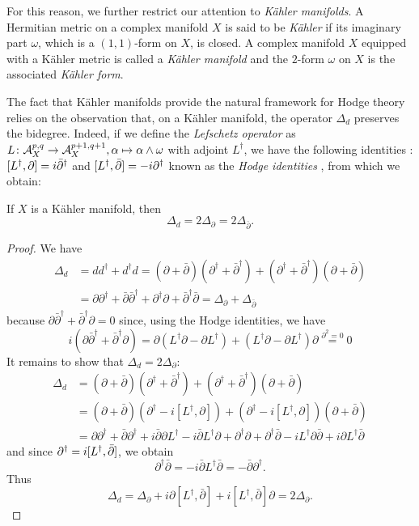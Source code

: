 \documentclass[../main.tex]{subfiles}
\begin{document}
For this reason, we further restrict our attention to \emph{K\"{a}hler manifolds}. A Hermitian metric on a complex manifold $X$ is said to be \emph{K\"{a}hler} if its imaginary part $\omega$, which is a $(1,1)$-form on $X$, is closed. A complex manifold $X$ equipped with a K\"{a}hler metric is called a \emph{K\"{a}hler manifold} and the $2$-form $\omega$ on $X$ is the associated \emph{K\"{a}hler form}. 

The fact that K\"{a}hler manifolds provide the natural framework for Hodge theory relies on the observation that, on a K\"{a}hler manifold, the operator $\Delta_d$ preserves the bidegree. Indeed, if we define the \emph{Lefschetz operator} as $L\colon \mathcal{A}^{p,q}_X \to \mathcal{A}^{p+1,q+1}_X, \alpha \mapsto \alpha\wedge\omega$ with adjoint $L^\dag$, we have the following identities \cite[Prop. 6.5]{Voi07}: $[L^\dag,\partial]=i\Bar{\partial}^\dag$ and $[L^\dag,\Bar{\partial}]=-i\partial^\dag$ known as the \emph{Hodge identities} , from which we obtain:

\begin{theorem} \label{proportionality} If $X$ is a K\"{a}hler manifold, then 
\[\Delta_d = 2\Delta_{\partial}= 2\Delta_{\overline{\partial}}.\]
\end{theorem}
\begin{proof}
    We have
    \begin{align*}
    \Delta_d &= d d^\dag + d^\dag d = (\partial + \bar\partial)(\partial^\dag + \bar\partial^\dag) + (\partial^\dag + \bar\partial^\dag)(\partial + \bar\partial) \\
    &= \partial \partial^\dag +  \bar\partial \bar\partial^\dag + \partial^\dag \partial +  \bar\partial^\dag \bar\partial = \Delta_{\partial} + \Delta_{\bar \partial}
    \end{align*}
    because $\partial \bar\partial^\dag + \bar\partial^\dag \partial =0$ since, using the Hodge identities, we have
    \[
    i (\partial \bar\partial^\dag + \bar\partial^\dag \partial) = \partial (L^\dag \partial -  \partial L^\dag) + (L^\dag \partial -  \partial L^\dag) \partial \stackrel{\partial^2 = 0}{=} 0
    \]
    It remains to show that $\Delta_{d} = 2 \Delta_{\partial}$:
    \begin{align*}
    \Delta_{d} &=  (\partial + \bar\partial)(\partial^\dag + \bar\partial^\dag) + (\partial^\dag + \bar\partial^\dag)(\partial + \bar\partial) \\
    &=  (\partial + \bar\partial)(\partial^\dag - i [L^\dag , \partial]) + (\partial^\dag - i [L^\dag , \partial] )(\partial + \bar\partial) \\
    &= \partial \partial^\dag +  \bar\partial \partial^\dag + i  \bar\partial \partial L^\dag -i \bar\partial  L^\dag \partial +  \partial^\dag \partial + \partial^\dag \bar\partial - i   L^\dag  \partial \bar\partial + i \partial   L^\dag  \bar\partial
    \end{align*}
    and since $\partial^\dag = i [L^\dag,\Bar{\partial}]$, we obtain 
    \[
    \partial^\dag \bar\partial = -i \bar\partial  L^\dag \bar\partial = -\bar\partial \partial^\dag.
    \]
    Thus
    \[
    \Delta_{d} = \Delta_{\partial} + i \partial [L^\dag , \bar\partial] + i  [L^\dag , \bar\partial] \partial = 2 \Delta_{\partial}.
    \]
\end{proof}
\end{document}
